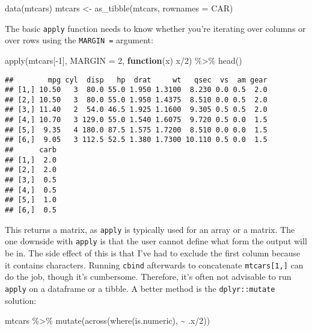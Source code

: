 \documentclass[
]{book}
\newenvironment{Shaded}{\begin{snugshade}}{\end{snugshade}}
\newcommand{\AttributeTok}[1]{\textcolor[rgb]{0.77,0.63,0.00}{#1}}
\newcommand{\ControlFlowTok}[1]{\textcolor[rgb]{0.13,0.29,0.53}{\textbf{#1}}}
\newcommand{\DecValTok}[1]{\textcolor[rgb]{0.00,0.00,0.81}{#1}}
\newcommand{\FunctionTok}[1]{\textcolor[rgb]{0.00,0.00,0.00}{#1}}
\newcommand{\NormalTok}[1]{#1}
\newcommand{\OtherTok}[1]{\textcolor[rgb]{0.56,0.35,0.01}{#1}}
\newcommand{\SpecialCharTok}[1]{\textcolor[rgb]{0.00,0.00,0.00}{#1}}
\newcommand{\StringTok}[1]{\textcolor[rgb]{0.31,0.60,0.02}{#1}}
\begin{document}
\begin{Shaded}
\begin{Highlighting}[]
\FunctionTok{data}\NormalTok{(mtcars)}
\NormalTok{mtcars }\OtherTok{\textless{}{-}} \FunctionTok{as\_tibble}\NormalTok{(mtcars, }\AttributeTok{rownames =} \StringTok{\textquotesingle{}CAR\textquotesingle{}}\NormalTok{)}
\end{Highlighting}
\end{Shaded}

The basic \texttt{apply} function needs to know whether you're iterating over columns or over rows using the \texttt{MARGIN\ =} argument:

\begin{Shaded}
\begin{Highlighting}[]
\FunctionTok{apply}\NormalTok{(mtcars[}\SpecialCharTok{{-}}\DecValTok{1}\NormalTok{], }\AttributeTok{MARGIN =} \DecValTok{2}\NormalTok{, }\ControlFlowTok{function}\NormalTok{(x) x}\SpecialCharTok{/}\DecValTok{2}\NormalTok{) }\SpecialCharTok{\%\textgreater{}\%} \FunctionTok{head}\NormalTok{()}
\end{Highlighting}
\end{Shaded}

\begin{verbatim}
##        mpg cyl  disp   hp  drat     wt   qsec  vs  am gear
## [1,] 10.50   3  80.0 55.0 1.950 1.3100  8.230 0.0 0.5  2.0
## [2,] 10.50   3  80.0 55.0 1.950 1.4375  8.510 0.0 0.5  2.0
## [3,] 11.40   2  54.0 46.5 1.925 1.1600  9.305 0.5 0.5  2.0
## [4,] 10.70   3 129.0 55.0 1.540 1.6075  9.720 0.5 0.0  1.5
## [5,]  9.35   4 180.0 87.5 1.575 1.7200  8.510 0.0 0.0  1.5
## [6,]  9.05   3 112.5 52.5 1.380 1.7300 10.110 0.5 0.0  1.5
##      carb
## [1,]  2.0
## [2,]  2.0
## [3,]  0.5
## [4,]  0.5
## [5,]  1.0
## [6,]  0.5
\end{verbatim}

This returns a matrix, as \texttt{apply} is typically used for an array or a matrix. The one downside with \texttt{apply} is that the user cannot define what form the output will be in. The side effect of this is that I've had to exclude the first column because it contains characters. Running \texttt{cbind} afterwards to concatenate \texttt{mtcars{[}1,{]}} can do the job, though it's cumbersome. Therefore, it's often not advisable to run \texttt{apply} on a dataframe or a tibble. A better method is the \texttt{dplyr::mutate} solution:

\begin{Shaded}
\begin{Highlighting}[]
\NormalTok{mtcars }\SpecialCharTok{\%\textgreater{}\%} \FunctionTok{mutate}\NormalTok{(}\FunctionTok{across}\NormalTok{(}\FunctionTok{where}\NormalTok{(is.numeric), }\SpecialCharTok{\textasciitilde{}}\NormalTok{ .x}\SpecialCharTok{/}\DecValTok{2}\NormalTok{))}
\end{Highlighting}
\end{Shaded}
\end{document}
